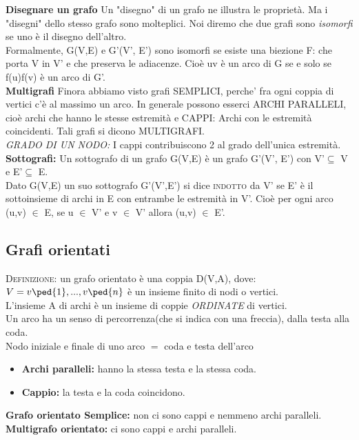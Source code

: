 \textbf{Disegnare un grafo} 
 Un "disegno" di un grafo ne illustra le proprietà. Ma i "disegni" dello stesso grafo sono molteplici. Noi
diremo che due grafi sono \emph{isomorfi} se uno è il disegno dell'altro. \\
Formalmente, G(V,E) e G’(V’, E’) sono isomorfi se esiste una biezione F: che porta V in V’ e che preserva le
adiacenze. Cioè uv è un arco di G se e solo se f(u)f(v) è un arco di G’. \\
\textbf{Multigrafi} Finora abbiamo visto grafi SEMPLICI, perche' fra ogni coppia di vertici c'è al massimo un arco. In generale possono esserci ARCHI PARALLELI, cioè archi che hanno le stesse estremità e CAPPI: Archi
con le estremità coincidenti. Tali grafi si dicono MULTIGRAFI. \\
\textit{GRADO DI UN NODO:} I cappi contribuiscono 2 al grado dell'unica estremità.\\
\textbf{Sottografi:} Un sottografo di un grafo G(V,E) è un grafo G'(V', E') con V'$\subseteq$ V e E'$\subseteq$ E. \\
Dato G(V,E) un suo sottografo G'(V',E') si dice \textsc{indotto} da V' se E' è il sottoinsieme di archi in E con entrambe le estremità in V'. Cioè per ogni arco (u,v) $\in$ E, se u $\in$ V' e v $\in$ V' allora (u,v) $\in$ E'. 

\subsection{Grafi orientati}
\textsc{Definizione:} un grafo orientato è una coppia D(V,A), dove: \\
\( V={ v\ped{1}, ...,v\ped{n}} \) è un insieme finito di nodi o vertici. \\
L'insieme A di archi è un insieme di coppie \emph{ORDINATE} di vertici. \\
Un arco ha un senso di percorrenza(che si indica con una freccia), dalla testa alla coda. \\

Nodo iniziale e finale di uno arco $=$ coda e testa dell'arco
\begin{itemize}
\item \textbf{Archi paralleli:} hanno la stessa testa e la stessa coda.
\item \textbf{Cappio:} la testa e la coda coincidono.
\end{itemize}
\textbf{Grafo orientato Semplice:} non ci sono cappi e nemmeno archi paralleli.
\textbf{Multigrafo orientato:} ci sono cappi e archi paralleli. 

